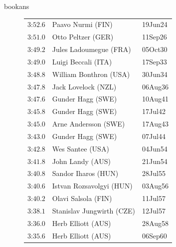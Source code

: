 \begin{exercises}
\begin{Filesave}{bookans}
\begin{figure}
{{\begin{tabular}[t]{|l|ll|}
         $\text{3:52}.6$   &Paavo Nurmi (FIN)      &19Jun24  \\
         $\text{3:51}.0$   &Otto Peltzer (GER)     &11Sep26  \\
         $\text{3:49}.2$   &Jules Ladoumegue (FRA) &05Oct30  \\
         $\text{3:49}.0$   &Luigi Beccali (ITA)    &17Sep33  \\
         $\text{3:48}.8$   &William Bonthron (USA) &30Jun34  \\
         $\text{3:47}.8$   &Jack Lovelock (NZL)    &06Aug36  \\
         $\text{3:47}.6$   &Gunder Hagg (SWE)      &10Aug41  \\
         $\text{3:45}.8$   &Gunder Hagg (SWE)      &17Jul42  \\
         $\text{3:45}.0$   &Arne Andersson (SWE)   &17Aug43  \\
         $\text{3:43}.0$   &Gunder Hagg (SWE)      &07Jul44  \\
         $\text{3:42}.8$   &Wes Santee (USA)       &04Jun54  \\
         $\text{3:41}.8$   &John Landy (AUS)       &21Jun54  \\
         $\text{3:40}.8$   &Sandor Iharos (HUN)    &28Jul55  \\
         $\text{3:40}.6$   &Istvan Rozsavolgyi (HUN) &03Aug56 \\
         $\text{3:40}.2$   &Olavi Salsola (FIN)    &11Jul57  \\
         $\text{3:38}.1$   &Stanislav Jungwirth (CZE) &12Jul57  \\
         $\text{3:36}.0$   &Herb Elliott (AUS)     &28Aug58  \\
         $\text{3:35}.6$   &Herb Elliott (AUS)     &06Sep60  \\

\end{tabular}}}
\end{figure}
\end{Filesave}
\end{exercises}
